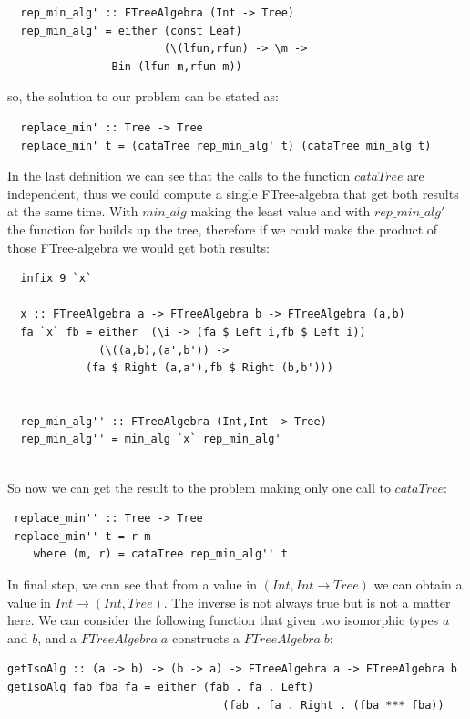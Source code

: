 \documentclass[a4paper,10pt]{article}
\begin{document}
\begin{lstlisting}
  rep_min_alg' :: FTreeAlgebra (Int -> Tree)
  rep_min_alg' = either (const Leaf) 
                        (\(lfun,rfun) -> \m -> 
			    Bin (lfun m,rfun m))
\end{lstlisting}

\noindent so, the solution to our problem can be stated as:

\begin{lstlisting}
  replace_min' :: Tree -> Tree
  replace_min' t = (cataTree rep_min_alg' t) (cataTree min_alg t) 
\end{lstlisting}

In the last definition we can see that the calls to the function $cataTree$ are independent, thus
we could compute a single FTree-algebra that get both results at the same time. With $min\_alg$
making the least value and with $rep\_min\_alg'$ the function for builds up the tree, therefore if
we could make the product of those FTree-algebra we would get both results:

\begin{lstlisting}
  infix 9 `x`

  x :: FTreeAlgebra a -> FTreeAlgebra b -> FTreeAlgebra (a,b)
  fa `x` fb = either  (\i -> (fa $ Left i,fb $ Left i))
		      (\((a,b),(a',b')) -> 
			(fa $ Right (a,a'),fb $ Right (b,b')))
			  

  rep_min_alg'' :: FTreeAlgebra (Int,Int -> Tree)
  rep_min_alg'' = min_alg `x` rep_min_alg'
  
\end{lstlisting}

So now we can get the result to the problem making only one call to $cataTree$:

\begin{lstlisting}
 replace_min'' :: Tree -> Tree
 replace_min'' t = r m
    where (m, r) = cataTree rep_min_alg'' t
\end{lstlisting}

In final step, we can see that from a value in $(Int,Int \rightarrow Tree)$ we can
obtain a value in $Int \rightarrow (Int,Tree)$. The inverse is not always true but 
is not a matter here.
We can consider the following function that given two isomorphic types
$a$ and $b$, and a $FTreeAlgebra\;a$ constructs a $FTreeAlgebra\;b$:

\begin{lstlisting}
getIsoAlg :: (a -> b) -> (b -> a) -> FTreeAlgebra a -> FTreeAlgebra b
getIsoAlg fab fba fa = either (fab . fa . Left)
                                 (fab . fa . Right . (fba *** fba))
\end{lstlisting}
\end{document}
